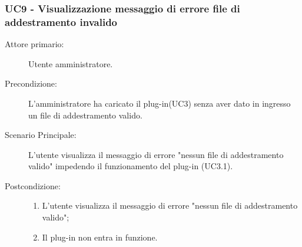 \subsubsection{UC9 - Visualizzazione messaggio di errore file di addestramento invalido}
\label{sssec:uc9}
\begin{description}
	\item[Attore primario:] Utente amministratore.
	\item[Precondizione:] L'amministratore ha caricato il plug-in(UC3) senza aver dato in ingresso un file di addestramento valido.
	\item[Scenario Principale:] L'utente visualizza il messaggio di errore "nessun file di addestramento valido" impedendo il funzionamento del plug-in (UC3.1).
	\item[Postcondizione:]
	\begin{enumerate}
		\item L'utente visualizza il messaggio di errore "nessun file di addestramento valido";
		\item Il plug-in non entra in funzione.
	\end{enumerate}
\end{description}